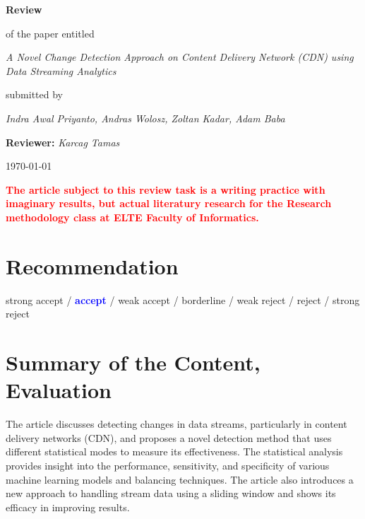 \documentclass[a4paper,12pt]{article}
\begin{document}
\setcounter{secnumdepth}{0}
\setlength{\parindent}{0cm}

\newcommand{\score}[1]{\hfill\textit{(#1~points)}}
\newcommand{\select}[1]{{\Large\textbf{\textcolor{blue}{#1}}}}




\begin{center}
{\LARGE \textbf{Review}}
\bigskip

of the paper entitled
\medskip

{\large \textit{A Novel Change Detection Approach on Content Delivery Network (CDN) using Data Streaming Analytics}}
\medskip

submitted by
\medskip

{\large \textit{Indra Awal Priyanto, Andras Wolosz, Zoltan Kadar, Adam Baba}}

\bigskip

{\large \textbf{Reviewer:} \textit{Karcag Tamas}}
\medskip

\today

\end{center}

\vspace{1cm}


{\footnotesize\textcolor{red}{\textbf{The article subject to this review task is a writing practice with imaginary results, but actual literatury research for the Research methodology class at ELTE Faculty of Informatics.}}}



\section{Recommendation}

strong accept / \select{accept} / weak accept / borderline / weak reject / reject / strong reject


\section{Summary of the Content, Evaluation}

The article discusses detecting changes in data streams, particularly in content delivery networks (CDN), and proposes a novel detection method that uses different statistical modes to measure its effectiveness. The statistical analysis provides insight into the performance, sensitivity, and specificity of various machine learning models and balancing techniques. The article also introduces a new approach to handling stream data using a sliding window and shows its efficacy in improving results.
\end{document}
